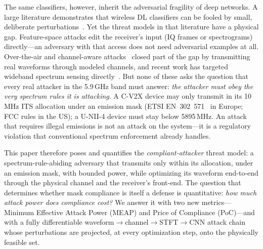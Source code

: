 \documentclass[review]{elsarticle}
\begin{document}
The same classifiers, however, inherit the adversarial fragility of deep
networks. A large literature demonstrates that wireless DL classifiers can be
fooled by small, deliberate perturbations~\cite{sadeghi2019,liu2022}. Yet the
threat models in that literature have a physical gap. Feature-space attacks
edit the receiver's input (IQ frames or spectrograms) directly---an adversary
with that access does not need adversarial examples at all. Over-the-air and
channel-aware attacks~\cite{kim2020,sagduyu2021,radioshock2026} closed part of
the gap by transmitting real waveforms through modeled channels, and recent
work has targeted wideband spectrum sensing directly~\cite{zheng2026}. But
none of these asks the question that every real attacker in the 5.9\,GHz band
must answer: \emph{the attacker must obey the very spectrum rules it is
attacking}. A C-V2X device may only transmit in its 10\,MHz ITS allocation
under an emission mask (ETSI EN~302~571~\cite{etsi302571} in Europe; FCC rules
in the US); a U-NII-4 device must stay below 5895\,MHz. An attack that
requires illegal emissions is not an attack on the system---it is a
regulatory violation that conventional spectrum enforcement already handles.

This paper therefore poses and quantifies the \emph{compliant-attacker}
threat model: a spectrum-rule-abiding adversary that transmits only within its
allocation, under an emission mask, with bounded power, while optimizing its
waveform end-to-end through the physical channel and the receiver's
front-end. The question that determines whether mask compliance is itself a
defense is quantitative: \emph{how much attack power does compliance cost?}
We answer it with two new metrics---Minimum Effective Attack Power (MEAP) and
Price of Compliance (PoC)---and with a fully differentiable
waveform$\to$channel$\to$STFT$\to$CNN attack chain whose perturbations are
projected, at every optimization step, onto the physically feasible set.
\end{document}
